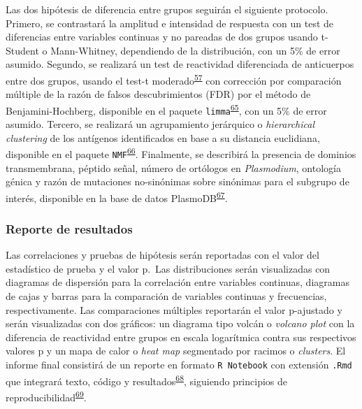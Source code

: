 \documentclass[a4paper]{article}
\begin{document}
Las dos hipótesis de diferencia entre grupos seguirán el siguiente
protocolo. Primero, se contrastará la amplitud e intensidad de respuesta
con un test de diferencias entre variables continuas y no pareadas de
dos grupos usando t-Student o Mann-Whitney, dependiendo de la
distribución, con un 5\% de error asumido. Segundo, se realizará un test
de reactividad diferenciada de anticuerpos entre dos grupos, usando el
test-t
moderado\textsuperscript{\protect\hyperlink{ref-smyth2004ebayes}{57}}
con corrección por comparación múltiple de la razón de falsos
descubrimientos (FDR) por el método de Benjamini-Hochberg, disponible en
el paquete
\texttt{limma}\textsuperscript{\protect\hyperlink{ref-limma}{65}}, con
un 5\% de error asumido. Tercero, se realizará un agrupamiento
jerárquico o \emph{hierarchical clustering} de los antígenos
identificados en base a su distancia euclidiana, disponible en el
paquete
\texttt{NMF}\textsuperscript{\protect\hyperlink{ref-Gaujoux2010NMF}{66}}.
Finalmente, se describirá la presencia de dominios transmembrana,
péptido señal, número de ortólogos en \emph{Plasmodium}, ontología
génica y razón de mutaciones no-sinónimas sobre sinónimas para el
subgrupo de interés, disponible en la base de datos
PlasmoDB\textsuperscript{\protect\hyperlink{ref-plasmodb}{67}}.

\subsubsection{Reporte de resultados}\label{reporte-de-resultados}

Las correlaciones y pruebas de hipótesis serán reportadas con el valor
del estadístico de prueba y el valor p.~Las distribuciones serán
visualizadas con diagramas de dispersión para la correlación entre
variables continuas, diagramas de cajas y barras para la comparación de
variables continuas y frecuencias, respectivamente. Las comparaciones
múltiples reportarán el valor p-ajustado y serán visualizadas con dos
gráficos: un diagrama tipo volcán o \emph{volcano plot} con la
diferencia de reactividad entre grupos en escala logarítmica contra sus
respectivos valores p y un mapa de calor o \emph{heat map} segmentado
por racimos o \emph{clusters}. El informe final consistirá de un reporte
en formato \texttt{R\ Notebook} con extensión \texttt{.Rmd} que
integrará texto, código y
resultados\textsuperscript{\protect\hyperlink{ref-knitr}{68}}, siguiendo
principios de
reproducibilidad\textsuperscript{\protect\hyperlink{ref-CienciaReproducible2016}{69}}.
\end{document}
